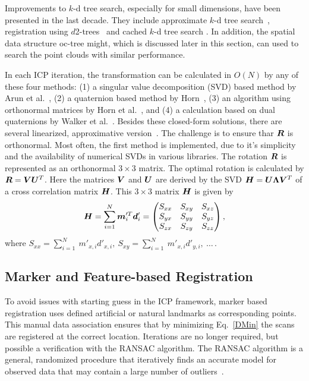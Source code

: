 \documentclass[twocolumn,oneside]{book}
\newcommand{\V}[1]{\vector{#1}}  %
\newcommand{\M}[1]{\V{#1}}    %
\begin{document}
Improvements to $k$-d tree search, especially for small dimensions,
have been presented in the last decade. They include approximate $k$-d
tree search~\cite{Greenspan_2003}, registration using
$d$2-trees~\cite{Mitra_2004} and cached $k$-d tree search
\cite{3DIM_2007}. In addition, the spatial data structure oc-tree
might, which is discussed later in this section, can used to search
the point clouds with similar performance.

In each ICP iteration, the transformation can be calculated in $O(N)$
by any of these four methods: (1) a singular value decomposition (SVD)
based method by Arun et al.~\cite{Arun_1987}, (2) a quaternion based
method by Horn~\cite{Horn_1988}, (3) an algorithm using orthonormal
matrices by Horn et al.~\cite{Horn_1987}, and (4) a calculation based
on dual quaternions by Walker et al.~\cite{Walker_1991}. Besides these
closed-form solutions, there are several linearized, approximative
version~\cite{CVIU2010}. The challenge is to ensure thar $\M R$ is
orthonormal. Most often, the first method is implemented, due to it's
simplicity and the availability of numerical SVDs in various
libraries. The rotation $\M R$ is represented as an orthonormal $3
\times 3$ matrix.  The optimal rotation is calculated by $\M R = \M V
\M U^T$. Here the matrices $\M V$ and $\M U$ are derived by the SVD
$\M H = \M U \M \Lambda \M V^T$ of a cross correlation matrix $\M
H$. This $3 \times 3$ matrix $\M H$ is given by
\begin{align}
\M H =  \sum_{i=1}^{N} \V m'^T_i \V d'_i 
 =  \begin{pmatrix}
S_{xx} & S_{xy} & S_{xz} \\
S_{yx} & S_{yy} & S_{yz} \\
S_{zx} & S_{zy} & S_{zz} \\
\end{pmatrix}, \label{korrelation} 
\end{align}
where $S_{xx} = \sum_{i=1}^{N} \ m'_{x,i} d'_{x,i}, \ S_{xy} =
\sum_{i=1}^{N} \ m'_{x,i} d'_{y,i}, \ \ldots \, $.

\subsection{Marker and Feature-based Registration} 

To avoid issues with starting guess in the ICP framework, marker based
registration uses defined artificial or natural landmarks as
corresponding points. This manual data association ensures that by
minimizing Eq.~\eqref{DMin} the scans are registered at the correct
location. Iterations are no longer required, but possible a
verification with the RANSAC algorithm. The RANSAC algorithm is a
general, randomized procedure that iteratively finds an accurate model
for observed data that may contain a large number of
outliers~\cite{Fischler:1981}.
\end{document}
